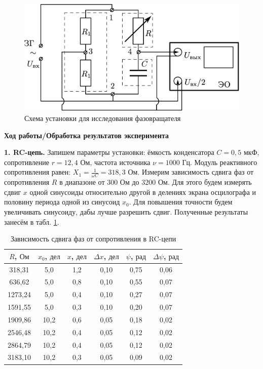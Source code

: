 \documentclass[a4paper, 12pt]{article}
\begin{document}
    \begin{figure}[ht]
        \centering
        \includegraphics[width=0.5\linewidth]{images/picture2.png}
        \caption{Схема установки для исследования фазовращателя}
        \label{pic2}
    \end{figure}
    
    \newpage
    
    \begin{flushleft}
        {\Large {\bf Ход работы/Обработка результатов эксперимента}}
    \end{flushleft}
    
    {\bf 1. RC-цепь.} Запишем параметры установки: ёмкость конденсатора $C = 0,5 \text{ мкФ}$, сопротивление $r = 12,4 \text{ Ом}$, частота источника $\nu = 1000 \text{ Гц}$. Модуль реактивного сопротивления равен: $X_1 = \frac{1}{\omega C} = 318,3 \text{ Ом}$. Измерим зависимость сдвига фаз от сопротивления $R$ в диапазоне от $300 \text{ Ом}$ до $3200 \text{ Ом}$. Для этого будем измерять сдвиг $x$ одной синусоиды относительно другой в делениях экрана осцилографа и половину периода одной из синусоид $x_0$. Для повышения точности будем увеличивать синусоиду, дабы лучше разрешить сдвиг. Полученные результаты занесём в табл. \ref{table1}.
    
    \begin{table}[ht]
        \centering
        \begin{tabular}{|c|c|c|c|c|c|}
            \hline
            $R$, $\text{Ом}$ & $x_0$, $\text{дел}$ & $x$, $\text{дел}$ & $\Delta x$, $\text{дел}$ & $\psi$, $\text{рад}$ & $\Delta \psi$, $\text{рад}$ \\
            \hline
            318,31 & 5,0 & 1,2 & 0,10 & 0,75 & 0,06 \\
            \hline
            636,62 & 5,0 & 0,8 & 0,10 & 0,55 & 0,07 \\
            \hline
            1273,24 & 5,0 & 0,4 & 0,10 & 0,27 & 0,07 \\
            \hline
            1591,55 & 5,0 & 0,3 & 0,10 & 0,20 & 0,07 \\
            \hline
            1909,86 & 10,2 & 0,6 & 0,05 & 0,18 & 0,02 \\
            \hline
            2546,48 & 10,2 & 0,4 & 0,05 & 0,12 & 0,02 \\
            \hline
            2864,79 & 10,2 & 0,4 & 0,05 & 0,12 & 0,02 \\
            \hline
            3183,10 & 10,2 & 0,3 & 0,05 & 0,09 & 0,02 \\
            \hline
        \end{tabular}
        \caption{Зависимость сдвига фаз от сопротивления в RC-цепи}
        \label{table1}
    \end{table}
    
\end{document}
